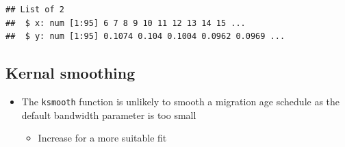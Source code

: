 \documentclass[
]{book}
\newenvironment{Shaded}{\begin{snugshade}}{\end{snugshade}}
\newcommand{\AttributeTok}[1]{\textcolor[rgb]{0.77,0.63,0.00}{#1}}
\newcommand{\DecValTok}[1]{\textcolor[rgb]{0.00,0.00,0.81}{#1}}
\newcommand{\FunctionTok}[1]{\textcolor[rgb]{0.00,0.00,0.00}{#1}}
\newcommand{\NormalTok}[1]{#1}
\newcommand{\OtherTok}[1]{\textcolor[rgb]{0.56,0.35,0.01}{#1}}
\newcommand{\SpecialCharTok}[1]{\textcolor[rgb]{0.00,0.00,0.00}{#1}}
\providecommand{\tightlist}{%
  \setlength{\itemsep}{0pt}\setlength{\parskip}{0pt}}
\begin{document}
\begin{verbatim}
## List of 2
##  $ x: num [1:95] 6 7 8 9 10 11 12 13 14 15 ...
##  $ y: num [1:95] 0.1074 0.104 0.1004 0.0962 0.0969 ...
\end{verbatim}

\hypertarget{kernal-smoothing}{%
\subsection{Kernal smoothing}\label{kernal-smoothing}}

\begin{itemize}
\tightlist
\item
  The \texttt{ksmooth} function is unlikely to smooth a migration age schedule as the default bandwidth parameter is too small

  \begin{itemize}
  \tightlist
  \item
    Increase for a more suitable fit
  \end{itemize}
\end{itemize}

\begin{Shaded}
\end{Shaded}
\end{document}
